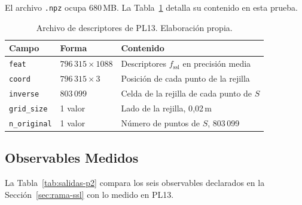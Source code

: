 El archivo \texttt{.npz} ocupa 680\,MB. La Tabla~\ref{tab:npz} detalla su
contenido en esta prueba.

\begin{table}[!htbp]
\centering
{}\small
\caption[Archivo de descriptores de PL13]{Archivo de descriptores de PL13. Elaboración propia.}
\label{tab:npz}
\begin{tabularx}{\linewidth}{@{}ll>{\raggedright\arraybackslash\hsize=1.00\hsize}X@{}}
\toprule
\textbf{Campo} & \textbf{Forma} & \textbf{Contenido} \\
\midrule
\texttt{feat} & $796\,315\times 1088$ & Descriptores $f_{\mathrm{ssl}}$ en precisión media \\
\texttt{coord} & $796\,315\times 3$ & Posición de cada punto de la rejilla \\
\texttt{inverse} & $803\,099$ & Celda de la rejilla de cada punto de $S$ \\
\texttt{grid\_size} & 1 valor & Lado de la rejilla, 0{,}02\,m \\
\texttt{n\_original} & 1 valor & Número de puntos de $S$, 803\,099 \\
\bottomrule
\end{tabularx}
\end{table}

\FloatBarrier
\subsection{Observables Medidos}
\label{sec:res-observables}

La Tabla~\ref{tab:salidas-p2} compara los seis observables declarados en la
Sección~\ref{sec:rama-ssl} con lo medido en PL13.

